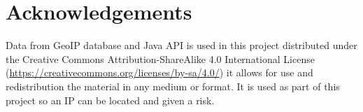 
\chapter{Acknowledgements}
Data from \citeauthor{javaloc} GeoIP database and Java API is used in this  project  distributed under the Creative Commons Attribution-ShareAlike 4.0 International License (\url{https://creativecommons.org/licenses/by-sa/4.0/}) it allows for use and redistribution the material in any medium or format. It is used as part of this project so an IP can be located and given a risk.